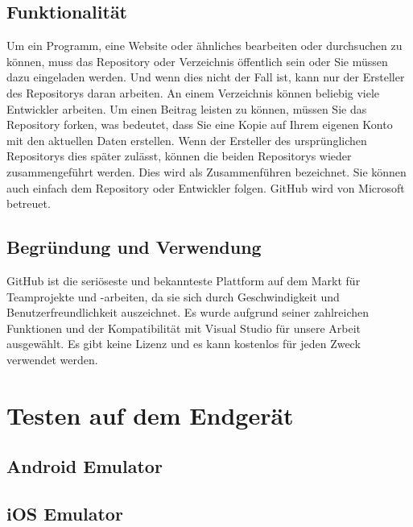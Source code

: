\subsection*{Funktionalität}
Um ein Programm, eine Website oder ähnliches bearbeiten oder durchsuchen zu können, 
muss das Repository oder Verzeichnis öffentlich sein oder Sie müssen dazu eingeladen 
werden. Und wenn dies nicht der Fall ist, kann nur der Ersteller des Repositorys 
daran arbeiten. An einem Verzeichnis können beliebig viele Entwickler arbeiten. 
Um einen Beitrag leisten zu können, müssen Sie das Repository forken, was bedeutet, 
dass Sie eine Kopie auf Ihrem eigenen Konto mit den aktuellen Daten erstellen. 
Wenn der Ersteller des ursprünglichen Repositorys dies später zulässt, können die 
beiden Repositorys wieder zusammengeführt werden. Dies wird als Zusammenführen 
bezeichnet. Sie können auch einfach dem Repository oder Entwickler folgen. 
GitHub wird von Microsoft betreuet.
\subsection*{Begründung und Verwendung}
GitHub ist die seriöseste und bekannteste Plattform auf dem Markt für Teamprojekte 
und -arbeiten, da sie sich durch Geschwindigkeit und Benutzerfreundlichkeit 
auszeichnet. Es wurde aufgrund seiner zahlreichen Funktionen und der Kompatibilität 
mit Visual Studio für unsere Arbeit ausgewählt. Es gibt keine Lizenz und es kann 
kostenlos für jeden Zweck verwendet werden.
\newpage

\section{Testen auf dem Endgerät}
\subsection{Android Emulator}
\subsection{iOS Emulator}